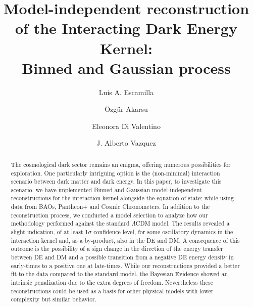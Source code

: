 \documentclass[twocolumn,a4paper,reprint,amssymb,aps,prd,groupedaddress,superscriptaddress,nofootinbib]{revtex4-2}
\begin{document}
\title{
Model-independent reconstruction of the Interacting Dark Energy Kernel:\\
Binned and Gaussian process}


\author{Luis A. Escamilla}

\author{\"{O}zg\"{u}r Akarsu}

\author{Eleonora Di Valentino}


\author{J. Alberto Vazquez}

\begin{abstract}


The cosmological dark sector remains an enigma, offering numerous possibilities for exploration. One particularly intriguing option is the (non-minimal) interaction scenario between dark matter and dark energy. In this paper, to investigate this scenario, we have implemented Binned and Gaussian model-independent reconstructions for the interaction kernel alongside the equation of state; while using data from BAOs, Pantheon+ and Cosmic Chronometers. In addition to the reconstruction process, we conducted a model selection to analyze how our methodology performed against the standard $\Lambda$CDM model. The results revealed a slight indication, of at least 1$\sigma$ confidence level, for some oscillatory dynamics in the interaction kernel and, as a by-product, also in the DE and DM. A consequence of this outcome is the possibility of a sign change in the direction of the energy transfer between DE and DM and a possible transition from a negative DE energy density in early-times to a positive one at late-times. While our reconstructions provided a better fit to the data compared to the standard model, the Bayesian  Evidence showed an intrinsic penalization due to the extra degrees of freedom.  Nevertheless these reconstructions could be used as a basis for other physical models with lower complexity but similar behavior.
\end{abstract}
\end{document}
